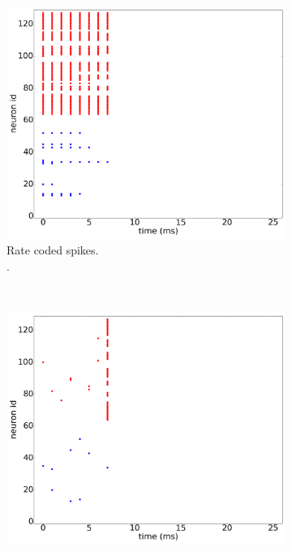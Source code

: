 \documentclass[conference]{IEEEtran}
\begin{document}
\begin{figure}[hbt]
  \captionsetup[subfigure]{justification=centering}
  
  \centering
  \begin{subfigure}[b]{0.31\textwidth}
    \includegraphics[width=\textwidth]{rate_coded_-8x8-_cycle_0}
    \caption{Rate coded spikes.\\ .}
    \label{fig:rate_spikes}
  \end{subfigure}~
  \begin{subfigure}[b]{0.31\textwidth}
    \includegraphics[width=\textwidth]{time_coded_-8x8-_cycle_0}

\end{subfigure}
\end{figure}
\end{document}
